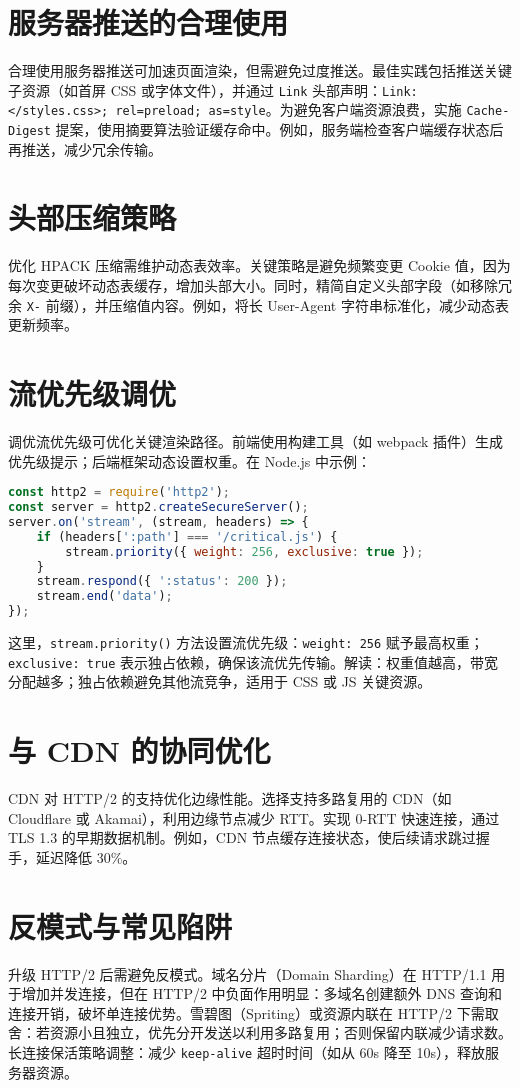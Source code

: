 \section{服务器推送的合理使用}
合理使用服务器推送可加速页面渲染，但需避免过度推送。最佳实践包括推送关键子资源（如首屏 CSS 或字体文件），并通过 \texttt{Link} 头部声明：\texttt{Link: </styles.css>; rel=preload; as=style}。为避免客户端资源浪费，实施 \texttt{Cache-Digest} 提案，使用摘要算法验证缓存命中。例如，服务端检查客户端缓存状态后再推送，减少冗余传输。\par
\section{头部压缩策略}
优化 HPACK 压缩需维护动态表效率。关键策略是避免频繁变更 Cookie 值，因为每次变更破坏动态表缓存，增加头部大小。同时，精简自定义头部字段（如移除冗余 \texttt{X-} 前缀），并压缩值内容。例如，将长 User-Agent 字符串标准化，减少动态表更新频率。\par
\section{流优先级调优}
调优流优先级可优化关键渲染路径。前端使用构建工具（如 webpack 插件）生成优先级提示；后端框架动态设置权重。在 Node.js 中示例：\par
\begin{lstlisting}[language=javascript]
const http2 = require('http2');
const server = http2.createSecureServer();
server.on('stream', (stream, headers) => {
    if (headers[':path'] === '/critical.js') {
        stream.priority({ weight: 256, exclusive: true });
    }
    stream.respond({ ':status': 200 });
    stream.end('data');
});
\end{lstlisting}
这里，\texttt{stream.priority()} 方法设置流优先级：\texttt{weight: 256} 赋予最高权重；\texttt{exclusive: true} 表示独占依赖，确保该流优先传输。解读：权重值越高，带宽分配越多；独占依赖避免其他流竞争，适用于 CSS 或 JS 关键资源。\par
\section{与 CDN 的协同优化}
CDN 对 HTTP/2 的支持优化边缘性能。选择支持多路复用的 CDN（如 Cloudflare 或 Akamai），利用边缘节点减少 RTT。实现 0-RTT 快速连接，通过 TLS 1.3 的早期数据机制。例如，CDN 节点缓存连接状态，使后续请求跳过握手，延迟降低 30\%{}。\par
\section{反模式与常见陷阱}
升级 HTTP/2 后需避免反模式。域名分片（Domain Sharding）在 HTTP/1.1 用于增加并发连接，但在 HTTP/2 中负面作用明显：多域名创建额外 DNS 查询和连接开销，破坏单连接优势。雪碧图（Spriting）或资源内联在 HTTP/2 下需取舍：若资源小且独立，优先分开发送以利用多路复用；否则保留内联减少请求数。长连接保活策略调整：减少 \texttt{keep-alive} 超时时间（如从 60s 降至 10s），释放服务器资源。\par
